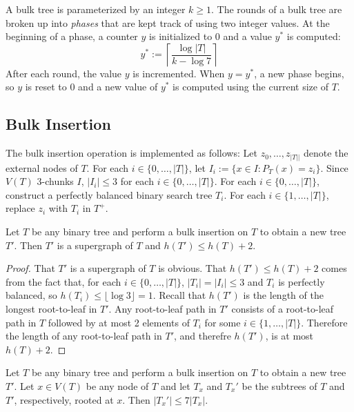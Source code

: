 \documentclass[kpfonts]{patmorin}
\begin{document}
A bulk tree is parameterized by an integer $k\ge 1$.  The rounds of a bulk tree are broken up into \emph{phases} that are kept track of using two integer values.  At the beginning of a phase, a counter $y$ is initialized to $0$ and a value $y^*$ is computed:
\[  
  y^* := \left\lceil \frac{\log|T|}{k-\log 7}\right\rceil 
\]
After each round, the value $y$ is incremented.  When $y=y^*$, a new phase begins, so $y$ is reset to 0 and a new value of $y^*$ is computed using the current size of $T$.

\subsection{Bulk Insertion}

The bulk insertion operation is implemented as follows: Let $z_0,\ldots,z_{|T||}$ denote the external nodes of $T$.  For each $i\in\{0,\ldots,|T|\}$, let $I_i:=\{x\in I: P_T(x)=z_i\}$. Since $V(T)$ $3$-chunks $I$, $|I_i|\le 3$ for each $i\in\{0,\ldots,|T|\}$. For each $i\in\{0,\ldots,|T|\}$, construct a perfectly balanced binary search tree $T_i$. For each $i\in\{1,\ldots,|T|\}$, replace $z_i$ with $T_i$ in $T^+$.

\begin{lem}
  Let $T$ be any binary tree and perform a bulk insertion on $T$ to obtain a new tree $T'$.  Then $T'$ is a supergraph of $T$ and $h(T')\le h(T)+2$.
\end{lem}

\begin{proof}
  That $T'$ is a supergraph of $T$ is obvious.  That $h(T')\le h(T)+2$ comes from the fact that, for each $i\in\{0,\ldots,|T|\}$, $|T_i|=|I_i|\le 3$ and $T_i$ is perfectly balanced, so $h(T_i)\le\lfloor\log 3\rfloor = 1$. Recall that $h(T')$ is the length of the longest root-to-leaf in $T'$. Any root-to-leaf path in $T'$ consists of a root-to-leaf path in $T$ followed by at most 2 elements of $T_i$ for some $i\in\{1,\ldots,|T|\}$.  Therefore the length of any root-to-leaf path in $T'$, and therefre $h(T')$, is at most $h(T)+2$.
\end{proof}

\begin{lem}
  Let $T$ be any binary tree and perform a bulk insertion on $T$ to obtain a new tree $T'$.  Let $x\in V(T)$ be any node of $T$ and let $T_x$ and $T_x'$ be the subtrees of $T$ and $T'$, respectively, rooted at $x$.  Then $|T_x'|\le 7|T_x|$.
\end{lem}
\end{document}
